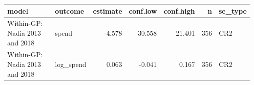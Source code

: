 
\begin{tabular}{llrrrrl}
\toprule
model & outcome & estimate & conf.low & conf.high & n & se\_type\\
\midrule
Within-GP: Nadia 2013 and 2018 & spend & -4.578 & -30.558 & 21.401 & 356 & CR2\\
Within-GP: Nadia 2013 and 2018 & log\_spend & 0.063 & -0.041 & 0.167 & 356 & CR2\\
\bottomrule
\end{tabular}
